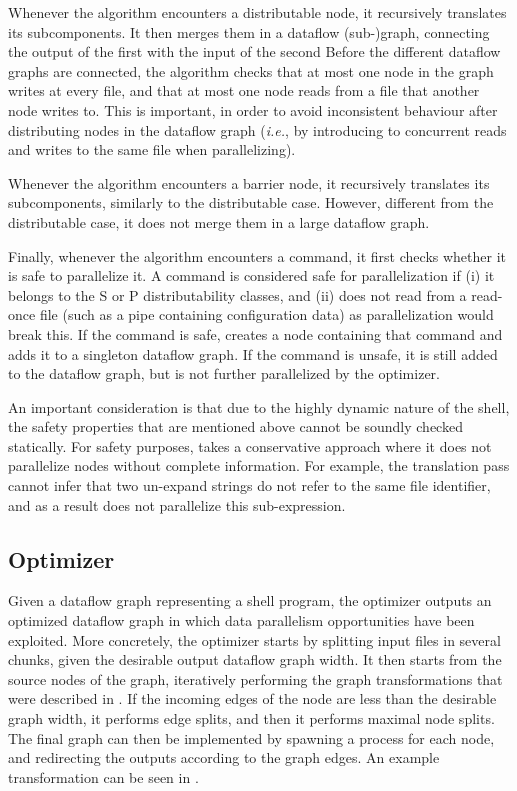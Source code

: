 \documentclass[acmsmall,10pt,review,anonymous]{acmart}
\newcommand{\ie}{{\em i.e.}, }
\newcommand{\cn}[1]{\mbox{\textcircled{\footnotesize #1}}}
\newcommand{\pur}{\cn{\textsc{P}}\xspace}
\newcommand{\sta}{\cn{\textsc{S}}\xspace}
\begin{document}
Whenever the algorithm encounters a distributable node, it recursively
translates its subcomponents.
It then merges them in a dataflow (sub-)graph, connecting the output of the first with the input of the second
Before the different dataflow graphs are connected, the
algorithm checks that at most one node in the graph writes at every
file, and that at most one node reads from a file that another node writes
to. This is important, in order to avoid inconsistent behaviour after
distributing nodes in the dataflow graph (\ie by introducing to
concurrent reads and writes to the same file when
parallelizing).

Whenever the algorithm encounters a barrier node,
it recursively translates its subcomponents, similarly to the distributable
case.
However, different from the distributable case, it does not merge them in a large dataflow graph.

Finally, whenever the algorithm encounters a command, it first
checks whether it is safe to parallelize it. A command is considered
safe for parallelization if (i) it belongs to the \sta or \pur distributability classes, and (ii) does not read from a read-once file (such as a pipe containing configuration data) as parallelization would break this. %
If the command is safe, \sys creates a node containing that command  and adds it to a singleton dataflow graph.
If the command is unsafe, it is still added to the dataflow graph, but is not further parallelized by the optimizer.

An important consideration is that due to the highly dynamic nature of
the shell, the safety properties that are mentioned above cannot be
soundly checked statically.
For safety purposes, \sys takes a conservative approach where it does not parallelize nodes without complete information.
For example, the translation pass cannot infer that two un-expand strings do not refer to the same file identifier, and as a result does not parallelize this sub-expression.

\subsection{Optimizer}
\label{optimizer}

Given a dataflow graph representing a shell program, the \sys optimizer outputs an optimized dataflow graph in which data parallelism opportunities have been exploited.
More concretely, the
optimizer starts by splitting input files in several chunks, given the
desirable output dataflow graph width. It then starts from the source
nodes of the graph, iteratively performing the graph transformations
that were described in . If the incoming
edges of the node are less than the desirable graph width, it performs
edge splits, and then it performs maximal node splits. The final graph
can then be implemented by spawning a process for each node, and
redirecting the outputs according to the graph edges. An example
transformation can be seen in .
\end{document}
